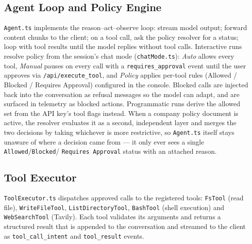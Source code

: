 \documentclass[12pt,a4paper,oneside]{report}
\begin{document}
\subsection{Agent Loop and Policy Engine}
\texttt{Agent.ts} implements the reason--act--observe loop: stream
model output; forward content chunks to the client; on a tool call,
ask the policy resolver for a status; loop with tool results until
the model replies without tool calls. Interactive runs resolve policy
from the session's chat mode (\texttt{chatMode.ts}): \emph{Auto}
allows every tool, \emph{Manual} pauses on every call with a
\texttt{requires\_approval} event until the user approves via
\texttt{/api/execute\_tool}, and \emph{Policy} applies per-tool rules
(Allowed / Blocked / Requires Approval) configured in the console.
Blocked calls are injected back into the conversation as refusal
messages so the model can adapt, and are surfaced in telemetry as
blocked actions. Programmatic runs derive the allowed set from the
API key's tool flags instead. When a company policy document is
active, the resolver evaluates it as a second, independent layer and
merges the two decisions by taking whichever is more restrictive, so
\texttt{Agent.ts} itself stays unaware of where a decision came from
--- it only ever sees a single \texttt{Allowed}/\texttt{Blocked}/
\texttt{Requires Approval} status with an attached reason.

\subsection{Tool Executor}
\texttt{ToolExecutor.ts} dispatches approved calls to the registered
tools: \texttt{FsTool} (read file), \texttt{WriteFileTool},
\texttt{ListDirectoryTool}, \texttt{BashTool} (shell execution) and
\texttt{WebSearchTool} (Tavily). Each tool validates its arguments and
returns a structured result that is appended to the conversation and
streamed to the client as \texttt{tool\_call\_intent} and
\texttt{tool\_result} events.
\end{document}
